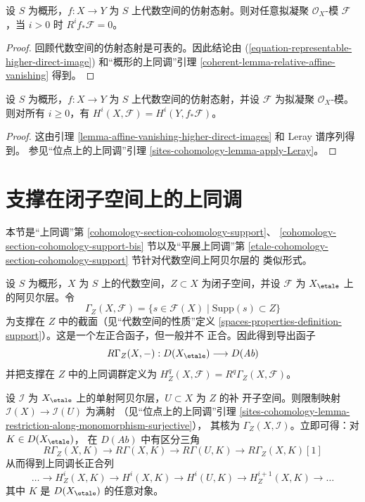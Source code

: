 \begin{lemma}
\label{lemma-affine-vanishing-higher-direct-images}
设 $S$ 为概形，$f : X \to Y$ 为 $S$ 上代数空间的仿射态射。则对任意拟凝聚
$\mathcal{O}_X$-模 $\mathcal{F}$，当 $i > 0$ 时
$R^if_*\mathcal{F} = 0$。
\end{lemma}

\begin{proof}
回顾代数空间的仿射态射是可表的。因此结论由
(\ref{equation-representable-higher-direct-image}) 和“概形的上同调”引理
\ref{coherent-lemma-relative-affine-vanishing} 得到。
\end{proof}

\begin{lemma}
\label{lemma-relative-affine-cohomology}
设 $S$ 为概形，$f : X \to Y$ 为 $S$ 上代数空间的仿射态射，并设
$\mathcal{F}$ 为拟凝聚 $\mathcal{O}_X$-模。则对所有 $i \geq 0$，有
$H^i(X, \mathcal{F}) = H^i(Y, f_*\mathcal{F})$。
\end{lemma}

\begin{proof}
这由引理 \ref{lemma-affine-vanishing-higher-direct-images} 和 Leray 谱序列得到。
参见“位点上的上同调”引理 \ref{sites-cohomology-lemma-apply-Leray}。
\end{proof}






\section{支撑在闭子空间上的上同调}
\label{section-cohomology-support}

\noindent
本节是“上同调”第 \ref{cohomology-section-cohomology-support}、
\ref{cohomology-section-cohomology-support-bis} 节以及“平展上同调”第
\ref{etale-cohomology-section-cohomology-support} 节针对代数空间上阿贝尔层的
类似形式。

\medskip\noindent
设 $S$ 为概形，$X$ 为 $S$ 上的代数空间，$Z \subset X$ 为闭子空间，并设
$\mathcal{F}$ 为 $X_\etale$ 上的阿贝尔层。令
$$
\Gamma_Z(X, \mathcal{F}) =
\{s \in \mathcal{F}(X) \mid \text{Supp}(s) \subset Z\}
$$
为支撑在 $Z$ 中的截面（见“代数空间的性质”定义
\ref{spaces-properties-definition-support}）。这是一个左正合函子，但一般并不
正合。因此得到导出函子
$$
R\Gamma_Z(X, -) : D(X_\etale) \longrightarrow D(\textit{Ab})
$$
并把支撑在 $Z$ 中的上同调群定义为
$H^q_Z(X, \mathcal{F}) = R^q\Gamma_Z(X, \mathcal{F})$。

\medskip\noindent
设 $\mathcal{I}$ 为 $X_\etale$ 上的单射阿贝尔层，$U \subset X$ 为 $Z$ 的补
开子空间。则限制映射 $\mathcal{I}(X) \to \mathcal{I}(U)$ 为满射
（见“位点上的上同调”引理
\ref{sites-cohomology-lemma-restriction-along-monomorphism-surjective}），
其核为 $\Gamma_Z(X, \mathcal{I})$。立即可得：对 $K \in D(X_\etale)$，
在 $D(\textit{Ab})$ 中有区分三角
$$
R\Gamma_Z(X, K) \to R\Gamma(X, K) \to R\Gamma(U, K) \to R\Gamma_Z(X, K)[1]
$$
从而得到上同调长正合列
$$
\ldots \to H^i_Z(X, K) \to H^i(X, K) \to H^i(U, K) \to
H^{i + 1}_Z(X, K) \to \ldots
$$
其中 $K$ 是 $D(X_\etale)$ 的任意对象。

